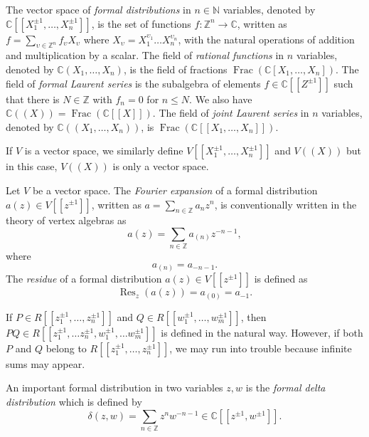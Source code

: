 \documentclass[a4paper, 12pt, reqno]{amsart}
\theoremstyle{remark}
\numberwithin{equation}{subsection}
\DeclareMathOperator{\Frac}{Frac}
\DeclareMathOperator{\Res}{Res}
\begin{document}
The vector space of \emph{formal distributions} in $n \in \mathbb{N}$ variables, denoted by $\mathbb{C}[[X_1^{\pm 1}, \dots, X_n^{\pm 1}]]$, is the set of functions $f: \mathbb{Z}^n \to \mathbb{C}$, written as $f = \sum_{\upsilon \in \mathbb{Z}^n}f_{\upsilon}X_{\upsilon}$ where $X_{\upsilon} = X^{\upsilon_1}_1\dots X^{\upsilon_n}_n$, with the natural operations of addition and multiplication by a scalar.
The field of \emph{rational functions} in $n$ variables, denoted by $\mathbb{C}(X_1, \dots, X_n)$, is the field of fractions $\Frac(\mathbb{C}[X_1, \dots, X_n])$.
The field of \emph{formal Laurent series} is the subalgebra of elements $f \in \mathbb{C}[[Z^{\pm 1}]]$ such that there is $N \in \mathbb{Z}$ with $f_n = 0$ for $n \le N$.
We also have $\mathbb{C}((X)) = \Frac(\mathbb{C}[[X]])$.
The field of \emph{joint Laurent series} in $n$ variables, denoted by $\mathbb{C}((X_1, \dots, X_n))$, is $\Frac(\mathbb{C}[[X_1, \dots, X_n]])$.

If $V$ is a vector space, we similarly define $V[[X_1^{\pm 1}, \dots, X_n^{\pm 1}]]$ and $V((X))$ but in this case, $V((X))$ is only a vector space.

Let $V$ be a vector space.
The \emph{Fourier expansion} of a formal distribution $a(z) \in V[[z^{\pm 1}]]$, written as $a = \sum_{n \in \mathbb{Z}} a_nz^n$, is conventionally written in the theory of vertex algebras as
\begin{equation*}
  a(z) = \sum_{n \in \mathbb{Z}}a_{(n)}z^{-n - 1},
\end{equation*}
where
\begin{equation*}
  a_{(n)} = a_{-n-1}.
\end{equation*}
The \emph{residue} of a formal distribution $a(z) \in V[[z^{\pm 1}]]$ is defined as
\begin{equation*}
  \Res_z(a(z)) = a_{(0)} = a_{-1}.
\end{equation*}

If $P\in R[[z_1^{\pm 1},\dots, z_n^{\pm 1}]]$ and $Q\in R[[w_1^{\pm 1},\dots, w_m^{\pm 1}]]$, then $PQ\in R[[z_1^{\pm 1},\dots z_n^{\pm 1},w_1^{\pm 1},\dots w_m^{\pm 1}]]$ is defined in the natural way.
However, if both $P$ and $Q$ belong to $R[[z_1^{\pm 1},\dots, z_n^{\pm 1}]]$, we may run into trouble because infinite sums may appear.

An important formal distribution in two variables $z, w$ is the \emph{formal delta distribution} which is defined by
\begin{equation*}
  \delta(z, w) = \sum_{n \in \mathbb{Z}}z^nw^{-n - 1} \in \mathbb{C}[[z^{\pm 1}, w^{\pm 1}]].
\end{equation*}
\end{document}
